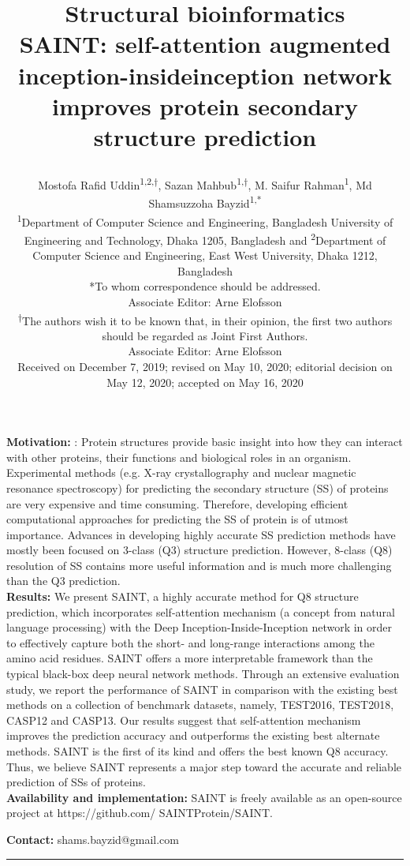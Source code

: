 \documentclass[8pt]{article}
\title{
\raggedright
Structural bioinformatics \\
\textbf{SAINT: self-attention augmented inception-insideinception network improves protein secondary structure
prediction}}
\author{
    \raggedright
    Mostofa Rafid Uddin\textsuperscript{1,2,†},
    Sazan Mahbub\textsuperscript{1,†},
    M. Saifur Rahman\textsuperscript{1},
    Md Shamsuzzoha Bayzid\textsuperscript{1,*}\\
    \vspace{0.5cm}
    \textsuperscript{1}Department of Computer Science and Engineering, Bangladesh University of Engineering and Technology, Dhaka 1205, Bangladesh and
    \textsuperscript{2}Department of Computer Science and Engineering, East West University, Dhaka 1212, Bangladesh\\
    \vspace{0.3cm}
    *To whom correspondence should be addressed.\\
    Associate Editor: Arne Elofsson\\
    \vspace{0.3cm}
    \textsuperscript{†}The authors wish it to be known that, in their opinion, the first two authors should be regarded as Joint First Authors.\\
    Associate Editor: Arne Elofsson\\
    Received on December 7, 2019; revised on May 10, 2020; editorial decision on May 12, 2020; accepted on May 16, 2020\\
}
\date{}
\begin{document}
\maketitle
\renewenvironment{abstract}%
{\noindent\textbf{\abstractname}\hspace{1em}}%
{\par}
\begin{abstract}
\newline
\textbf{Motivation: }: Protein structures provide basic insight into how they can interact with other proteins, their functions and biological roles in an organism. Experimental methods (e.g. X-ray crystallography and nuclear magnetic resonance spectroscopy) for predicting the secondary structure (SS) of proteins are very expensive and time consuming. Therefore, developing efficient computational approaches for predicting the SS of protein is of utmost importance. Advances in developing
highly accurate SS prediction methods have mostly been focused on 3-class (Q3) structure prediction. However, 8-class
(Q8) resolution of SS contains more useful information and is much more challenging than the Q3 prediction.\\
\textbf{Results: } We present SAINT, a highly accurate method for Q8 structure prediction, which incorporates self-attention mechanism (a concept from natural language processing) with the Deep Inception-Inside-Inception network in order to effectively capture both the short- and long-range interactions among the amino acid residues. SAINT offers a more interpretable framework than the typical black-box deep neural network methods. Through an extensive evaluation study, we report the performance of SAINT in comparison with the existing best methods on a collection of benchmark datasets, namely, TEST2016, TEST2018, CASP12 and CASP13. Our results suggest that self-attention
mechanism improves the prediction accuracy and outperforms the existing best alternate methods. SAINT is the first of its kind and offers the best known Q8 accuracy. Thus, we believe SAINT represents a major step toward the
accurate and reliable prediction of SSs of proteins.\\

\textbf{Availability and implementation: }SAINT is freely available as an open-source project at https://github.com/
SAINTProtein/SAINT.

\textbf{Contact: }shams.bayzid@gmail.com
\end{abstract}
\rule{\linewidth}{3pt}
\end{document}
